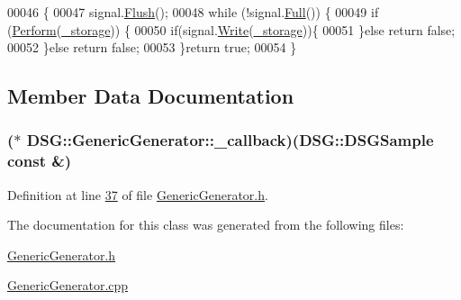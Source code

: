 \begin{DoxyCode}
00046                                                                  \{
00047         signal.\hyperlink{class_d_s_g_1_1_ring_buffer_ab23c8003d2857809a816068eeb209d60}{Flush}();
00048         \textcolor{keywordflow}{while} (!signal.\hyperlink{class_d_s_g_1_1_ring_buffer_a53ddb04ffcbb5470a8d2b0a3c65b70cb}{Full}()) \{
00049             \textcolor{keywordflow}{if} (\hyperlink{class_d_s_g_1_1_generic_generator_addcd9abbbf0e31f0af2ff18217a08302}{Perform}(\hyperlink{class_d_s_g_1_1_signal_generator_a28a9b47a1aa0783029f11a19ba0363f2}{\_storage})) \{
00050                 \textcolor{keywordflow}{if}(signal.\hyperlink{class_d_s_g_1_1_ring_buffer_aa5dd2caa0a270173251faee40a43d692}{Write}(\hyperlink{class_d_s_g_1_1_signal_generator_a28a9b47a1aa0783029f11a19ba0363f2}{\_storage}))\{
00051                 \}\textcolor{keywordflow}{else} \textcolor{keywordflow}{return} \textcolor{keyword}{false};
00052             \}\textcolor{keywordflow}{else} \textcolor{keywordflow}{return} \textcolor{keyword}{false};
00053         \}\textcolor{keywordflow}{return} \textcolor{keyword}{true};
00054     \}
\end{DoxyCode}


\subsection{Member Data Documentation}
\hypertarget{class_d_s_g_1_1_generic_generator_a0335953ca594a86f6059d4387e94b73d}{
\subsubsection[{\+\_\+callback}]{($\ast$ D\+S\+G\+::\+Generic\+Generator\+::\+\_\+callback)({\bf D\+S\+G\+::\+D\+S\+G\+Sample} const \&)\hspace{0.3cm}{\ttfamily [protected]}}}\label{class_d_s_g_1_1_generic_generator_a0335953ca594a86f6059d4387e94b73d}


Definition at line \hyperlink{_generic_generator_8h_source_l00037}{37} of file \hyperlink{_generic_generator_8h_source}{Generic\+Generator.\+h}.



The documentation for this class was generated from the following files\+:\begin{DoxyCompactItemize}
\item 
\hyperlink{_generic_generator_8h}{Generic\+Generator.\+h}\item 
\hyperlink{_generic_generator_8cpp}{Generic\+Generator.\+cpp}\end{DoxyCompactItemize}
